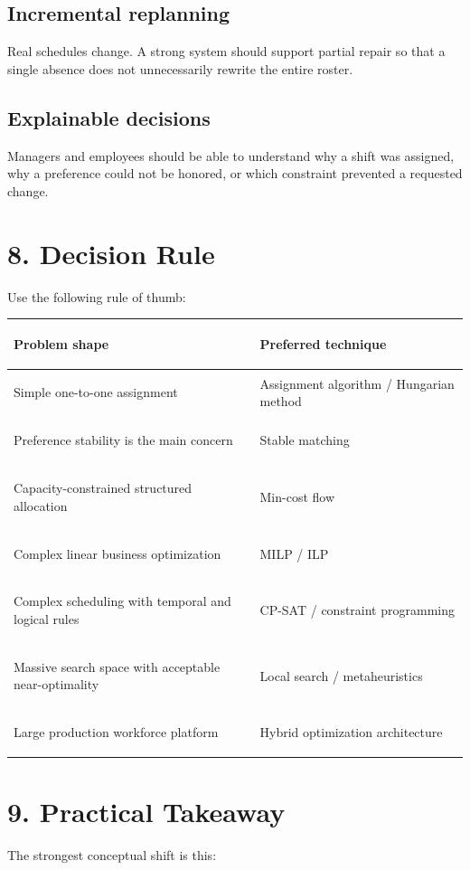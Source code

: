 \documentclass[11pt]{article}
\begin{document}
\subsection{Incremental replanning}
Real schedules change. A strong system should support partial repair so that a single absence does not unnecessarily rewrite the entire roster.

\subsection{Explainable decisions}
Managers and employees should be able to understand why a shift was assigned, why a preference could not be honored, or which constraint prevented a requested change.

\section{8. Decision Rule}

Use the following rule of thumb:

\begin{center}
\begin{tabularx}{0.94\textwidth}{>{\bfseries\raggedright\arraybackslash}p{} Y}
\toprule
Problem shape & Preferred technique \\
\midrule
Simple one-to-one assignment & Assignment algorithm / Hungarian method \\
Preference stability is the main concern & Stable matching \\
Capacity-constrained structured allocation & Min-cost flow \\
Complex linear business optimization & MILP / ILP \\
Complex scheduling with temporal and logical rules & CP-SAT / constraint programming \\
Massive search space with acceptable near-optimality & Local search / metaheuristics \\
Large production workforce platform & Hybrid optimization architecture \\
\bottomrule
\end{tabularx}
\end{center}

\section{9. Practical Takeaway}

The strongest conceptual shift is this:
\end{document}
